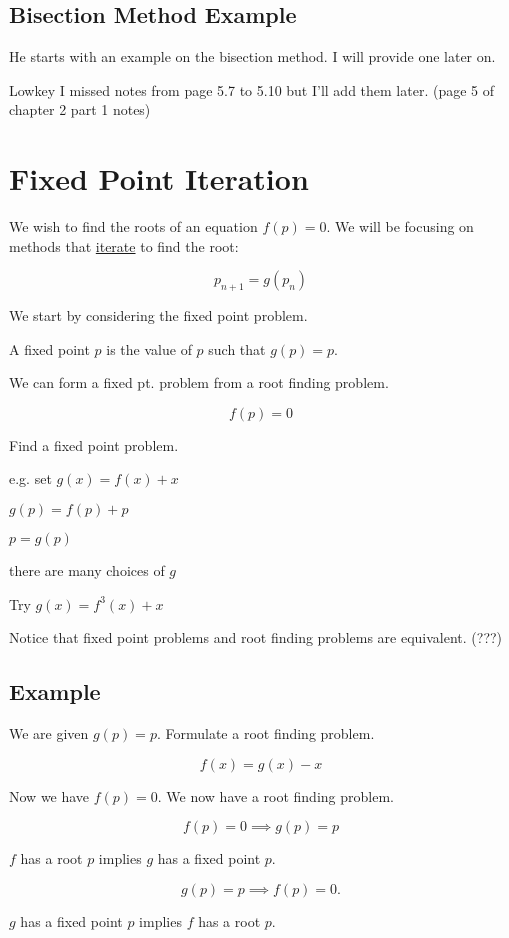 \subsection*{Bisection Method Example}

He starts with an example on the bisection method. I will provide one later on.

Lowkey I missed notes from page 5.7 to 5.10 but I'll add them later. (page 5 of
chapter 2 part 1 notes)

\section{Fixed Point Iteration}

We wish to find the roots of an equation $f(p) = 0$. We will be focusing on
methods that \uline{iterate} to find the root:

\[ p_{n+1} = g(p_n) \]

We start by considering the fixed point problem.

 A fixed point $p$ is the value of $p$ such that $g(p) = p$.

We can form a fixed pt. problem from a root finding problem.

\[ f(p) = 0 \]

Find a fixed point problem.

e.g. set $g(x) = f(x) + x$

$g(p) = f(p) + p$

$p = g(p)$

there are many choices of $g$

Try $g(x) = f^3(x) + x$

Notice that fixed point problems and root finding problems are equivalent. (???)

\subsection{Example}

We are given $g(p) = p$. Formulate a root finding problem.

\[ f(x) = g(x) - x \]

Now we have $f(p) = 0$. We now have a root finding problem.

\[ f(p) = 0 \implies g(p) = p \]

\ie $f$ has a root $p$ implies $g$ has a fixed point $p$.

\[
g(p) = p \implies f(p) = 0
.\]

\ie $g$ has a fixed point $p$ implies $f$ has a root $p$.


